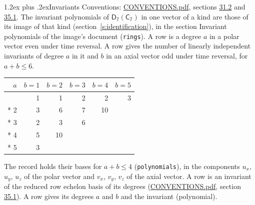 \documentclass[10pt,a4paper]{article}
\makeatletter
\renewcommand\section{\@startsection{section}{1}{\z@}{-3ex plus -1ex minus -.2ex}%
  {1.2ex plus .2ex}{\normalfont\large\sffamily\bfseries\color{parttitle}}}
\numberwithin{equation}{section}
\newcommand{\grp}[1]{\mathsf{#1}}
\makeatother
\begin{document}
\section{Invariants}\label{s:invariants}
Conventions: \href{../../CONVENTIONS.pdf}{CONVENTIONS.pdf}, sections \href{../../CONVENTIONS.pdf\#conv.31.2}{31.2} and \href{../../CONVENTIONS.pdf\#conv.35.1}{35.1}.
The invariant polynomials of $\grp{D_{7}}(\grp{C_{7}})$ in one vector of a kind are those of its image of that kind (section~\ref{s:identification}), in the section Invariant polynomials of the image's document (\texttt{rings}).
\leavevmode\label{n:index.degree.polar}\label{n:index.degree.axial}A row is a degree $a$ in a polar vector even under time reversal. A row gives the number of linearly independent invariants of degree $a$ in it and $b$ in an axial vector odd under time reversal, for $a + b \le 6$.
{\small\begin{longtable}{@{}rrrrrr@{}}\toprule
$a$ & $b = 1$ & $b = 2$ & $b = 3$ & $b = 4$ & $b = 5$\\\midrule\endhead
\bottomrule\endfoot\endlastfoot
1 & 1 & 1 & 2 & 2 & 3\\*
2 & 3 & 6 & 7 & 10 & \\*
3 & 2 & 3 & 6 &  & \\*
4 & 5 & 10 &  &  & \\*
5 & 3 &  &  &  & \\
\bottomrule\end{longtable}}
\leavevmode\label{n:local.component.polar}\label{n:local.component.axial}The record holds their bases for $a + b \le 4$ (\texttt{polynomials}), in the components $u_{x}$, $u_{y}$, $u_{z}$ of the polar vector and $v_{x}$, $v_{y}$, $v_{z}$ of the axial vector. \label{n:head.polynomial}A row is an invariant of the reduced row echelon basis of its degrees (\href{../../CONVENTIONS.pdf}{CONVENTIONS.pdf}, section \href{../../CONVENTIONS.pdf\#conv.35.1}{35.1}). A row gives its degrees $a$ and $b$ and the invariant (polynomial).
\end{document}
